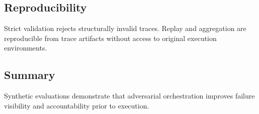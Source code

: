 \subsection{Reproducibility}
Strict validation rejects structurally invalid traces. Replay and aggregation are reproducible from trace artifacts without access to original execution environments.

\subsection{Summary}
Synthetic evaluations demonstrate that adversarial orchestration improves failure visibility and accountability prior to execution.

